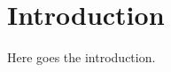 \documentclass[../paper.tex]{subfiles}
\begin{document}
\section{Introduction}

Here goes the introduction.
\end{document}
